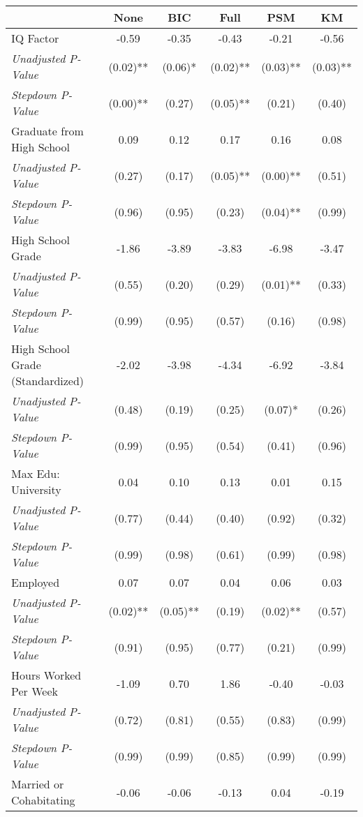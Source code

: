\begin{tabular}{l c c c c c}
\toprule
 & None & BIC & Full & PSM & KM \\
\midrule
IQ Factor & -0.59 & -0.35 & -0.43 & -0.21 & -0.56 \\
\quad \textit{Unadjusted P-Value} & (0.02)** & (0.06)* & (0.02)** & (0.03)** & (0.03)** \\
\quad \textit{Stepdown P-Value} & (0.00)** & (0.27) & (0.05)** & (0.21) & (0.40) \\
Graduate from High School & 0.09 & 0.12 & 0.17 & 0.16 & 0.08 \\
\quad \textit{Unadjusted P-Value} & (0.27) & (0.17) & (0.05)** & (0.00)** & (0.51) \\
\quad \textit{Stepdown P-Value} & (0.96) & (0.95) & (0.23) & (0.04)** & (0.99) \\
High School Grade & -1.86 & -3.89 & -3.83 & -6.98 & -3.47 \\
\quad \textit{Unadjusted P-Value} & (0.55) & (0.20) & (0.29) & (0.01)** & (0.33) \\
\quad \textit{Stepdown P-Value} & (0.99) & (0.95) & (0.57) & (0.16) & (0.98) \\
High School Grade (Standardized) & -2.02 & -3.98 & -4.34 & -6.92 & -3.84 \\
\quad \textit{Unadjusted P-Value} & (0.48) & (0.19) & (0.25) & (0.07)* & (0.26) \\
\quad \textit{Stepdown P-Value} & (0.99) & (0.95) & (0.54) & (0.41) & (0.96) \\
Max Edu: University & 0.04 & 0.10 & 0.13 & 0.01 & 0.15 \\
\quad \textit{Unadjusted P-Value} & (0.77) & (0.44) & (0.40) & (0.92) & (0.32) \\
\quad \textit{Stepdown P-Value} & (0.99) & (0.98) & (0.61) & (0.99) & (0.98) \\
Employed & 0.07 & 0.07 & 0.04 & 0.06 & 0.03 \\
\quad \textit{Unadjusted P-Value} & (0.02)** & (0.05)** & (0.19) & (0.02)** & (0.57) \\
\quad \textit{Stepdown P-Value} & (0.91) & (0.95) & (0.77) & (0.21) & (0.99) \\
Hours Worked Per Week & -1.09 & 0.70 & 1.86 & -0.40 & -0.03 \\
\quad \textit{Unadjusted P-Value} & (0.72) & (0.81) & (0.55) & (0.83) & (0.99) \\
\quad \textit{Stepdown P-Value} & (0.99) & (0.99) & (0.85) & (0.99) & (0.99) \\
Married or Cohabitating & -0.06 & -0.06 & -0.13 & 0.04 & -0.19 \\

\end{tabular}
